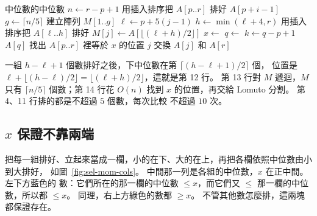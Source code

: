 \begin{pseudo}[label=alg:sel-mom, float=!tp]{中位數的中位數}
    \State $n \gets r - p + 1$
        \State 用插入排序把 $A[p..r]$ 排好
        \State \Return $A[p + i - 1]$
    \EndIf
    \State $g \gets \lceil n/5 \rceil$
    \State 建立陣列 $M[1..g]$
        \State $\ell \gets p + 5(j - 1)$
        \State $h \gets \min(\ell + 4, r)$
        \State 用插入排序把 $A[\ell..h]$ 排好
        \State $M[j] \gets A[\lfloor (\ell + h)/2 \rfloor]$ 
    \EndFor
    \State $x \gets$ 
    \State $q \gets$ 
    \State $k \gets q - p + 1$
        \State \Return $A[q]$
        \State \Return {}
    \Else
        \State \Return {}
    \EndIf
\EndFunction
\Statex
{}
    \State 找出 $A[p..r]$ 裡等於 $x$ 的位置 $j$
    \State 交換 $A[j]$ 和 $A[r]$
    \State \Return {}
\EndFunction
\end{pseudo}

一組 $h - \ell + 1$ 個數排好之後，下中位數在第 $\lceil (h - \ell + 1)/2 \rceil$ 個，
位置是 $\ell + \lfloor (h - \ell)/2 \rfloor = \lfloor (\ell + h)/2 \rfloor$，這就是第
12 行。 第 13 行對 $M$ 遞迴，$M$ 只有 $\lceil n/5 \rceil$ 個數；第 14 行花 $O(n)$
找到 $x$ 的位置，再交給 Lomuto 分割。 第 4、11 行排的都是不超過 $5$ 個數，每次比較
不超過 $10$ 次。

\subsection{\texorpdfstring{$x$}{x} 保證不靠兩端}

把每一組排好、立起來當成一欄，小的在下、大的在上，再把各欄依照中位數由小到大排好，
如圖~\ref{fig:sel-mom-cols}。 中間那一列是各組的中位數，$x$ 在正中間。 左下方藍色的
數：它們所在的那一欄的中位數 $\le x$，而它們又 $\le$ 那一欄的中位數，所以都 $\le x$。
同理，右上方綠色的數都 $\ge x$。 不管其他數怎麼排，這兩塊都保證存在。


